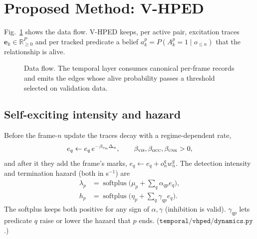 \documentclass[conference]{IEEEtran}
\newcommand{\softplus}{\operatorname{softplus}}
\newcommand{\VIS}{\textsc{vis}}
\newcommand{\OCC}{\textsc{occ}}
\newcommand{\UNK}{\textsc{unk}}
\begin{document}
\section{Proposed Method: V-HPED}
Fig.~\ref{fig:arch} shows the data flow. V-HPED keeps, per active pair, excitation
traces $\mathbf e_k\in\mathbb R^P_{\ge0}$ and per tracked predicate a belief
$a^p_k=P(A^p_k=1\mid o_{\le n})$ that the relationship is alive.

\begin{figure}[t]
\centering
{}
\caption{Data flow. The temporal layer consumes canonical per-frame records and emits
the edges whose alive probability passes a threshold selected on validation data.}
\label{fig:arch}
\end{figure}

\subsection{Self-exciting intensity and hazard}
Before the frame-$n$ update the traces decay with a regime-dependent rate,
\begin{equation}
e_q \leftarrow e_q\, e^{-\beta_{v_n}\Delta_n},\qquad \beta_{\VIS},\beta_{\OCC},\beta_{\UNK}>0,
\label{eq:decay}
\end{equation}
and after it they add the frame's marks, $e_q\leftarrow e_q+o^q_n w^q_n$. The
detection intensity and termination hazard (both in s$^{-1}$) are
\begin{align}
\lambda_p &= \softplus\!\Big(\mu_p+\textstyle\sum_q \alpha_{qp}e_q\Big),\label{eq:lambda}\\
h_p &= \softplus\!\Big(\eta_p+\textstyle\sum_q \gamma_{qp}e_q\Big).\label{eq:hazard}
\end{align}
The softplus keeps both positive for any sign of $\alpha,\gamma$ (inhibition is valid).
$\gamma_{qp}$ lets predicate $q$ raise or lower the hazard that $p$ ends.
($\texttt{temporal/vhped/dynamics.py}$.)
\end{document}

